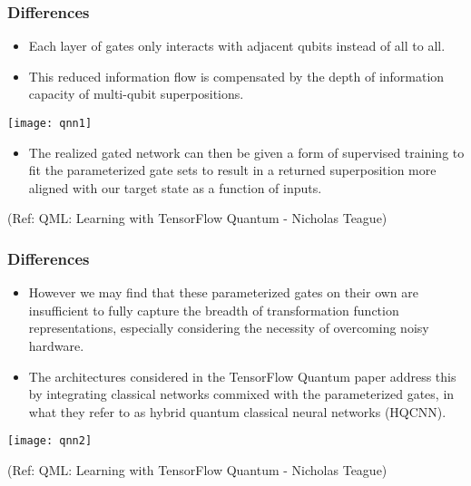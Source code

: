  \begin{frame}[fragile]\frametitle{Differences}
 
\begin{itemize}
\item  Each layer of gates only interacts with adjacent qubits
instead of all to all. 
\item This reduced information flow is compensated by the depth of
information capacity of multi-qubit superpositions.
\end{itemize}

\begin{center}
\texttt{[image: qnn1]}
\end{center}
	
\begin{itemize}
\item  The realized gated network can then be given a form of supervised training to fit the
parameterized gate sets to result in a returned superposition more aligned with our
target state as a function of inputs.
\end{itemize}
	
\tiny{(Ref: QML: Learning with TensorFlow Quantum - Nicholas Teague)}

\end{frame}

 \begin{frame}[fragile]\frametitle{Differences}
 
\begin{itemize}
\item  However we may find that these parameterized gates
on their own are insufficient to fully capture the breadth of transformation function
representations, especially considering the necessity of overcoming noisy hardware. 
\item The
architectures considered in the TensorFlow Quantum paper address this by integrating
classical networks commixed with the parameterized gates, in what they refer to as
hybrid quantum classical neural networks (HQCNN).
\end{itemize}

\begin{center}
\texttt{[image: qnn2]}
\end{center}
	

\tiny{(Ref: QML: Learning with TensorFlow Quantum - Nicholas Teague)}

\end{frame}

